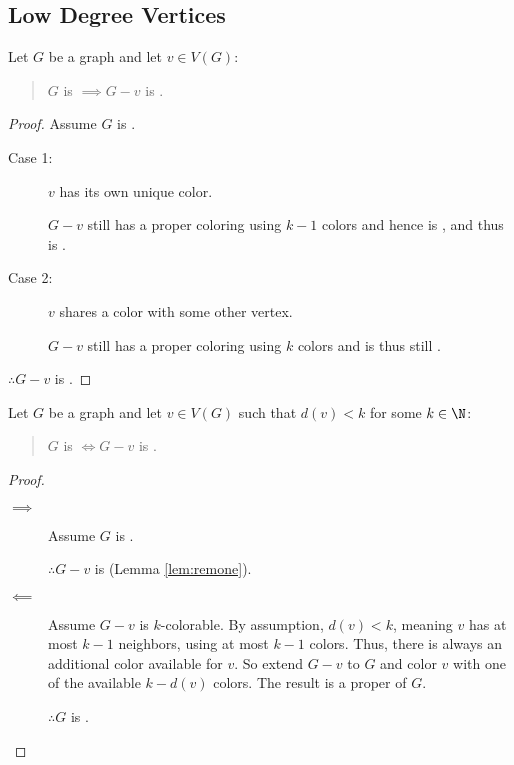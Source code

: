 \subsection{Low Degree Vertices}

\begin{lemma}
  \label{lem:remone}
  Let \(G\) be a graph and let \(v\in V(G)\):
  \begin{quote}
    \(G\) is  \(\implies G-v\) is .
  \end{quote}
\end{lemma}

\begin{proof}
  
  Assume \(G\) is .

  \begin{description}
  \item[Case 1:] \(v\) has its own unique color.
      
    \(G-v\) still has a proper coloring using \(k-1\) colors and hence is , and thus is .

  \item[Case 2:] \(v\) shares a color with some other vertex.

    \(G-v\) still has a proper coloring using \(k\) colors and is thus still .
  \end{description}

  \(\therefore G-v\) is .
\end{proof}

\begin{lemma}
  \label{lem:lowdeg}
  Let \(G\) be a graph and let \(v\in V(G)\) such that \(d(v)<k\) for some \(k\in\N\):
  \begin{quote}
    \(G\) is  \(\iff G-v\) is .
  \end{quote}
\end{lemma}

\begin{proof}
  \begin{description}
  \item[]
  \item[\(\implies\)] Assume \(G\) is .

    \(\therefore G-v\) is  (Lemma \ref{lem:remone}).

  \item[\(\impliedby\)] Assume \(G-v\) is \(k\)-colorable.
    By assumption, \(d(v)<k\), meaning \(v\) has at most \(k-1\) neighbors, using at most \(k-1\) colors.  Thus, there is
    always an additional color available for \(v\).  So extend \(G-v\) to \(G\) and color \(v\) with one of the available
    \(k-d(v)\) colors.  The result is a proper  of \(G\).

    \(\therefore G\) is .
  \end{description}
\end{proof}

